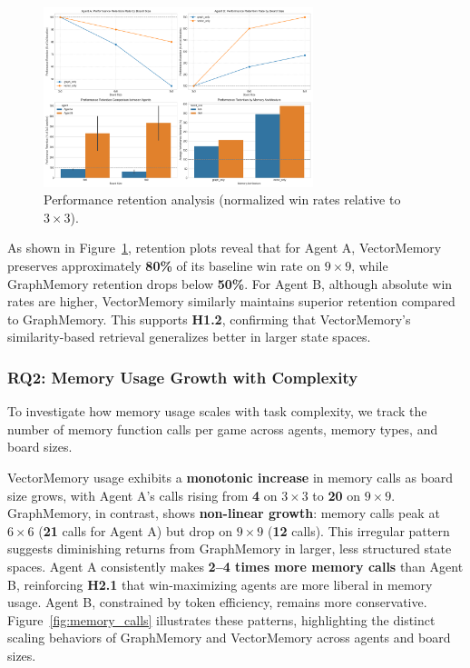 \documentclass[10pt]{article}
\begin{document}
\begin{figure}[ht]
\centering
\includegraphics[width=0.7\textwidth]{figures/performance_retention_analysis.png}
\caption{Performance retention analysis (normalized win rates relative to $3\times3$).}
\label{fig:performance_retention}
\end{figure}

As shown in Figure~\ref{fig:performance_retention}, retention plots reveal that for Agent A, VectorMemory preserves approximately \textbf{80\%} of its baseline win rate on $9 \times 9$, while GraphMemory retention drops below \textbf{50\%}. For Agent B, although absolute win rates are higher, VectorMemory similarly maintains superior retention compared to GraphMemory. This supports \textbf{H1.2}, confirming that VectorMemory's similarity-based retrieval generalizes better in larger state spaces.

\subsubsection{RQ2: Memory Usage Growth with Complexity}

To investigate how memory usage scales with task complexity, we track the number of memory function calls per game across agents, memory types, and board sizes.

VectorMemory usage exhibits a \textbf{monotonic increase} in memory calls as board size grows, with Agent A's calls rising from \textbf{4} on $3\times3$ to \textbf{20} on $9\times9$. GraphMemory, in contrast, shows \textbf{non-linear growth}: memory calls peak at $6\times6$ (\textbf{21} calls for Agent A) but drop on $9\times9$ (\textbf{12} calls). This irregular pattern suggests diminishing returns from GraphMemory in larger, less structured state spaces. Agent A consistently makes \textbf{2--4 times more memory calls} than Agent B, reinforcing \textbf{H2.1} that win-maximizing agents are more liberal in memory usage. Agent B, constrained by token efficiency, remains more conservative. Figure~\ref{fig:memory_calls} illustrates these patterns, highlighting the distinct scaling behaviors of GraphMemory and VectorMemory across agents and board sizes.
\end{document}
